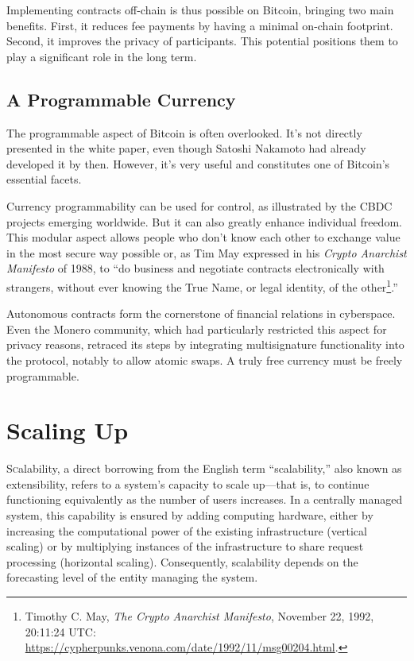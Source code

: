\documentclass[
  a5paper,
  smalldemyvopaper,10pt,twoside,onecolumn,openright,extrafontsizes,hidelinks]{memoir}
\begin{document}
Implementing contracts off-chain is thus possible on Bitcoin, bringing
two main benefits. First, it reduces fee payments by having a minimal
on-chain footprint. Second, it improves the privacy of participants.
This potential positions them to play a significant role in the long
term.

\section*{A Programmable Currency}\label{a-programmable-currency}


The programmable aspect of Bitcoin is often overlooked. It's not
directly presented in the white paper, even though Satoshi Nakamoto had
already developed it by then. However, it's very useful and constitutes
one of Bitcoin's essential facets.

Currency programmability can be used for control, as illustrated by the
CBDC projects emerging worldwide. But it can also greatly enhance
individual freedom. This modular aspect allows people who don't know
each other to exchange value in the most secure way possible or, as Tim
May expressed in his \emph{Crypto Anarchist Manifesto} of 1988, to ``do
business and negotiate contracts electronically with strangers, without
ever knowing the True Name, or legal identity, of the
other\footnote{Timothy C. May, \emph{The Crypto Anarchist Manifesto},
  November 22, 1992, 20:11:24 UTC:
  \url{https://cypherpunks.venona.com/date/1992/11/msg00204.html}.}.''

Autonomous contracts form the cornerstone of financial relations in
cyberspace. Even the Monero community, which had particularly restricted
this aspect for privacy reasons, retraced its steps by integrating
multisignature functionality into the protocol, notably to allow atomic
swaps. A truly free currency must be freely programmable.


\chapter{Scaling Up}\label{ch:scalability}

\label{enotezch:14}{}

{S}\textsc{c}alability, a direct borrowing from the English term
``scalability,'' also known as extensibility, refers to a system's
capacity to scale up---that is, to continue functioning equivalently as
the number of users increases. In a centrally managed system, this
capability is ensured by adding computing hardware, either by increasing
the computational power of the existing infrastructure (vertical
scaling) or by multiplying instances of the infrastructure to share
request processing (horizontal scaling). Consequently, scalability
depends on the forecasting level of the entity managing the system.
\end{document}

